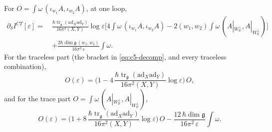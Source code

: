 \begin{theorem}
\label{thm:c5-Oeps}
For $O=\int\omega\,(\iota_{w_1}A,\iota_{w_2}A)$, at one loop,
\begin{equation}
\begin{aligned}
\partial_\delta I^{CT}[\varepsilon]=\ &\frac{\hbar\operatorname{tr}_{\mathfrak g}(\mathrm{ad}_X\mathrm{ad}_Y)}{16\pi^2(X,Y)}\log\varepsilon\Big[4\int\omega\,(\iota_{w_1}A,\iota_{w_2}A)-2(w_1,w_2)\int\omega\,(A|_{W_{\mathbb R}^\perp},A|_{W_{\mathbb R}^\perp})\Big]\\
&+\frac{2\hbar\dim\mathfrak g\,(w_1,w_2)}{16\pi^2\,\varepsilon}\int\omega .
\end{aligned}
\label{eq:c5-dICT}
\end{equation}
For the traceless part (the bracket in \eqref{eq:c5-decomp}, and every traceless combination),
\begin{equation}
O(\varepsilon)=\Big(1-4\,\frac{\hbar\operatorname{tr}_{\mathfrak g}(\mathrm{ad}_X\mathrm{ad}_Y)}{16\pi^2(X,Y)}\log\varepsilon\Big)\,O ,
\label{eq:c5-traceless}
\end{equation}
and for the trace part $O=\int\omega\,(A|_{W_{\mathbb R}^\perp},A|_{W_{\mathbb R}^\perp})$,
\begin{equation}
O(\varepsilon)=\Big(1+8\,\frac{\hbar\operatorname{tr}_{\mathfrak g}(\mathrm{ad}_X\mathrm{ad}_Y)}{16\pi^2(X,Y)}\log\varepsilon\Big)\,O-\frac{12\,\hbar\dim\mathfrak g}{16\pi^2\,\varepsilon}\int\omega .
\label{eq:c5-trace}
\end{equation}
\end{theorem}

